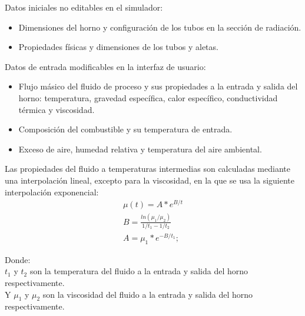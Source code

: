 \par Datos iniciales no editables en el simulador:
\begin{itemize}
    \item Dimensiones del horno y configuración de los tubos en la sección de radiación.
    \item Propiedades físicas y dimensiones de los tubos y aletas.
\end{itemize}
\par Datos de entrada modificables en la interfaz de usuario:
\begin{itemize}
    \item Flujo másico del fluido de proceso y sus propiedades a la entrada y salida del horno: temperatura, gravedad específica, calor específico, conductividad térmica y viscosidad.
    \item Composición del combustible y su temperatura de entrada.
    \item Exceso de aire, humedad relativa y temperatura del aire ambiental.
\end{itemize}
\par Las propiedades del fluido a temperaturas intermedias son calculadas mediante una interpolación lineal, excepto para la viscosidad, en la que se usa la siguiente interpolación exponencial:
\begin{equation}
\begin{gathered}
    \mu(t) = A * e^{B/t} \\
    B = \frac{ln(\mu_1/\mu_2)}{1/t_1 - 1/t_2} \\
    A = \mu_1 * e^{-B/t_1};
\end{gathered}
\end{equation}
\par Donde:\\
$t_1$ y $t_2$ son la temperatura del fluido a la entrada y salida del horno respectivamente.\\
Y $\mu_1$ y $\mu_2$ son la viscosidad del fluido a la entrada y salida del horno respectivamente.
